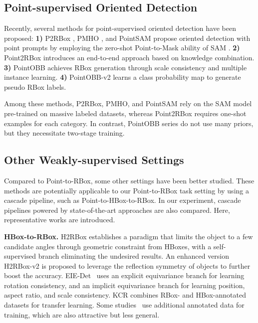 \subsection{Point-supervised Oriented Detection}

Recently, several methods for point-supervised oriented detection have been proposed: \textbf{1)} P2RBox \citep{cao2023p2rbox}, PMHO \citep{zhang2024pmho}, and PointSAM \citep{liu2024pointsam} propose oriented detection with point prompts by employing the zero-shot Point-to-Mask ability of SAM \citep{kirillov2023segment}. \textbf{2)} Point2RBox \citep{yu2024point2rbox} introduces an end-to-end approach based on knowledge combination. \textbf{3)} PointOBB \citep{luo2024pointobb, zhang2025pointobbv3} achieves RBox generation through scale consistency and multiple instance learning. \textbf{4)} PointOBB-v2 \cite{ren2024pointobbv2} learns a class probability map to generate pseudo RBox labels.

Among these methods, P2RBox, PMHO, and PointSAM rely on the SAM model pre-trained on massive labeled datasets, whereas Point2RBox requires one-shot examples for each category. In contrast, PointOBB series do not use many priors, but they necessitate two-stage training. 

\subsection{Other Weakly-supervised Settings} 

Compared to Point-to-RBox, some other settings have been better studied. These methods are potentially applicable to our Point-to-RBox task setting by using a cascade pipeline, such as Point-to-HBox-to-RBox. In our experiment, cascade pipelines powered by state-of-the-art approaches are also compared. Here, representative works are introduced.

\textbf{HBox-to-RBox.} H2RBox \citep{yang2023h2rbox} establishes a paradigm that limits the object to a few candidate angles through geometric constraint from HBoxes, with a self-supervised branch eliminating the undesired results. An enhanced version H2RBox-v2 \citep{yu2023h2rboxv2} is proposed to leverage the reflection symmetry of objects to further boost the accuracy. EIE-Det~\citep{wang2024explicit} uses an explicit equivariance branch for learning rotation consistency, and an implicit equivariance branch for learning position, aspect ratio, and scale consistency. KCR \cite{zhu2023knowledge} combines RBox- and HBox-annotated datasets for transfer learning. Some studies~\citep{iqbal2021leveraging,sun2021oriented} use additional annotated data for training, which are also attractive but less general.

